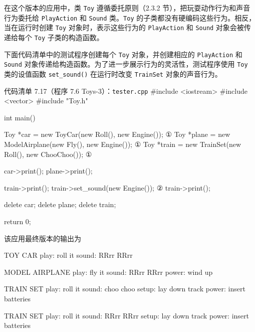 在这个版本的应用中，类 \texttt{Toy} 遵循委托原则（2.3.2 节），把玩耍动作行为和声音行为委托给 \texttt{Play\allowbreak{}Action} 和 \texttt{Sound} 类。\texttt{Toy} 的子类都没有硬编码这些行为。相反，当在运行时创建 \texttt{Toy} 对象时，表示这些行为的 \texttt{Play\allowbreak{}Action} 和 \texttt{Sound} 对象会被传递给每个 \texttt{Toy} 子类的构造函数。


下面代码清单中的测试程序创建每个 \texttt{Toy} 对象，并创建相应的 \texttt{Play\allowbreak{}Action} 和 \texttt{Sound} 对象传递给构造函数。为了进一步展示行为的灵活性，测试程序使用 \texttt{Toy} 类的设值函数 \texttt{set\_\allowbreak{}sound(\allowbreak{})\allowbreak{}} 在运行时改变 \texttt{TrainSet} 对象的声音行为。

\begin{codeboxt}{代码清单 7.17（程序 7.6 Toys-3）：\texttt{tester.\allowbreak{}cpp}}
#include <iostream>
#include <vector>
#include "Toy.h"

int main()
{
    Toy *car   = new ToyCar(new Roll(), new Engine());        ①
    Toy *plane = new ModelAirplane(new Fly(), new Engine());  ①
    Toy *train = new TrainSet(new Roll(), new ChooChoo());    ①

    car->print();
    plane->print();

    train->print();
    train->set_sound(new Engine());                           ②
    train->print();

    delete car;
    delete plane;
    delete train;

    return 0;
}
\end{codeboxt}
\par
{}\par

该应用最终版本的输出为

\begin{codebox}
TOY CAR
   play: roll it
  sound: RRrr RRrr

MODEL AIRPLANE
   play: fly it
  sound: RRrr RRrr
  power: wind up

TRAIN SET
   play: roll it
  sound: choo choo
  setup: lay down track
  power: insert batteries

TRAIN SET
   play: roll it
  sound: RRrr RRrr
  setup: lay down track
  power: insert batteries
\end{codebox}

